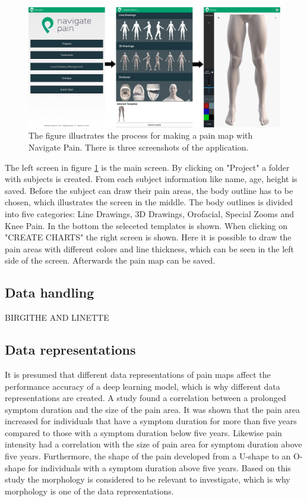 \begin{figure} [H]
\centering
\includegraphics[width=1\textwidth]{figures/Navigatepain}
\caption{The figure illustrates the process for making a pain map with Navigate Pain. There is three screenshots of the application.}
\label{fig:Navigatepain}
\end{figure}

\noindent
The left screen in figure \ref{fig:Navigatepain} is the main screen. By clicking on "Project" a folder with subjects is created. From each subject information like name, age, height is saved. Before the subject can draw their pain areas, the body outline has to be chosen, which illustrates the screen in the middle. The body outlines is divided into five categories: Line Drawings, 3D Drawings, Orofacial, Special Zooms and Knee Pain. In the bottom the seleceted templates is shown. When clicking on "CREATE CHARTS" the right screen is shown. Here it is possible to draw the pain areas with different colors and line thickness, which can be seen in the left side of the screen. Afterwards the pain map can be saved. 

\subsection{Data handling}
BIRGITHE AND LINETTE



\subsection{Data representations}
It is presumed that different data representations of pain maps affect the performance
accuracy of a deep learning model, which is why different data representations are created. 
A study found a correlation between a prolonged symptom duration and the size of the pain area. It was shown that the pain area increased for individuals that have a symptom duration for more than five years compared to those with a symptom duration below five years. Likewise pain intensity had a correlation with the size of pain area for symptom duration above five years. Furthermore, the shape of the pain developed from a U-shape to an O-shape for individuals with a symptom duration above five years.\citep{Boudreau2017} Based on this study the morphology is considered to be relevant to investigate, which is why morphology is one of the data representations.\\


